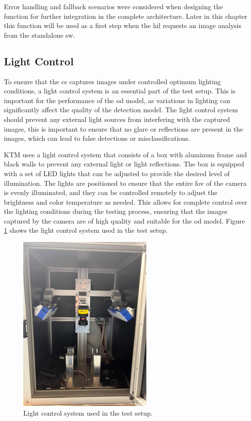 Error handling and fallback scenarios were considered when designing the function for further integration in the complete architecture. Later in this chapter this function will be used as a first step when the \gls{hil} requests an image analysis from the standalone \gls{sw}.







\subsection{Light Control}
To ensure that the \gls{cs} captures images under controlled optimum lighting conditions, a light control system is an essential part of the test setup. This is important for the performance of the \gls{od} model, as variations in lighting can significantly affect the quality of the detection model. The light control system should prevent any external light sources from interfering with the captured images, this is important to ensure that no glare or reflections are present in the images, which can lead to false detections or misclassifications.

KTM uses a light control system that consists of a box with aluminum frame and black walls to prevent any external light or light reflections. The box is equipped with a set of LED lights that can be adjusted to provide the desired level of illumination. The lights are positioned to ensure that the entire \gls{fov} of the camera is evenly illuminated, and they can be controlled remotely to adjust the brightness and color temperature as needed. This allows for complete control over the lighting conditions during the testing process, ensuring that the images captured by the camera are of high quality and suitable for the \gls{od} model. Figure \ref{LightControl} shows the light control system used in the test setup.

\begin{figure}[!htb]
    \centering
    \includegraphics[width=0.6\textwidth]{Figures/Light_Control_Box.jpg}
    \caption{Light control system used in the test setup.}
    \label{LightControl}
\end{figure}

